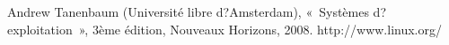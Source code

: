 
\begin{thebibliography}{10} %

Andrew Tanenbaum (Université libre d?Amsterdam), « Systèmes d?exploitation », 3ème édition, Nouveaux Horizons, 2008.
http://www.linux.org/


\end{thebibliography}